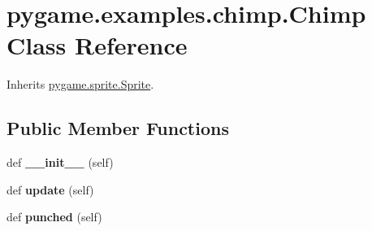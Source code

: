 \hypertarget{classpygame_1_1examples_1_1chimp_1_1_chimp}{}\section{pygame.\+examples.\+chimp.\+Chimp Class Reference}
\label{classpygame_1_1examples_1_1chimp_1_1_chimp}


Inherits \hyperlink{classpygame_1_1sprite_1_1_sprite}{pygame.\+sprite.\+Sprite}.

\subsection*{Public Member Functions}
\begin{DoxyCompactItemize}
\item 
\mbox{\label{classpygame_1_1examples_1_1chimp_1_1_chimp_aadf18cd6cd2d92390ceff59fc7490475}} 
def {\bfseries \+\_\+\+\_\+init\+\_\+\+\_\+} (self)
\item 
\mbox{\label{classpygame_1_1examples_1_1chimp_1_1_chimp_ab7d13757cd34cc235fb044f1165b8b36}} 
def {\bfseries update} (self)
\item 
\mbox{\label{classpygame_1_1examples_1_1chimp_1_1_chimp_a09f3b592a9d5727bb54595bca59e966e}} 
def {\bfseries punched} (self)
\end{DoxyCompactItemize}
